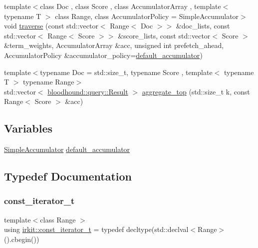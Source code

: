 \begin{DoxyCompactItemize}
\item 
{\footnotesize template$<$class Doc , class Score , class Accumulator\+Array , template$<$ typename T $>$ class Range, class Accumulator\+Policy  = Simple\+Accumulator$>$ }\\void \hyperlink{namespaceirkit_a8c1a48d323636892a6826df1b8ca25bf}{traverse} (const std\+::vector$<$ Range$<$ Doc $>$$>$ \&doc\+\_\+lists, const std\+::vector$<$ Range$<$ Score $>$$>$ \&score\+\_\+lists, const std\+::vector$<$ Score $>$ \&term\+\_\+weights, Accumulator\+Array \&acc, unsigned int prefetch\+\_\+ahead, Accumulator\+Policy \&accumulator\+\_\+policy=\hyperlink{namespaceirkit_a823671564bf545991e9708011e4a8df1}{default\+\_\+accumulator})
\item 
{\footnotesize template$<$typename Doc  = std\+::size\+\_\+t, typename Score , template$<$ typename T $>$ typename Range$>$ }\\std\+::vector$<$ \hyperlink{structbloodhound_1_1query_1_1Result}{bloodhound\+::query\+::\+Result} $>$ \hyperlink{namespaceirkit_aabff8eec068dbbd05abad382861327de}{aggregate\+\_\+top} (std\+::size\+\_\+t k, const Range$<$ Score $>$ \&acc)
\end{DoxyCompactItemize}
\subsection*{Variables}
\begin{DoxyCompactItemize}
\item 
\hyperlink{classirkit_1_1SimpleAccumulator}{Simple\+Accumulator} \hyperlink{namespaceirkit_a823671564bf545991e9708011e4a8df1}{default\+\_\+accumulator}
\end{DoxyCompactItemize}


\subsection{Typedef Documentation}
\mbox{\label{namespaceirkit_a4b1668583041117eb42c1b5a1091b804}} 
\subsubsection{\texorpdfstring{const\+\_\+iterator\+\_\+t}{const\_iterator\_t}}
{\footnotesize\ttfamily template$<$class Range $>$ \\
using \hyperlink{namespaceirkit_a4b1668583041117eb42c1b5a1091b804}{irkit\+::const\+\_\+iterator\+\_\+t} = typedef decltype(std\+::declval$<$Range$>$().cbegin())}

